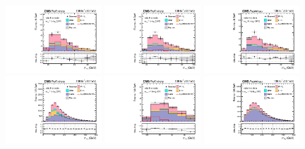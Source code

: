 \begin{figure}[ht]
    \begin{center}
        \includegraphics[width=0.32\textwidth]{figures/ch-10-results/et_all_1_post_prelim-yes.pdf}
        \includegraphics[width=0.32\textwidth]{figures/ch-10-results/et_all_2_post_prelim-yes.pdf}
        \includegraphics[width=0.32\textwidth]{figures/ch-10-results/et_all_3_post_prelim-yes.pdf}\\
        \includegraphics[width=0.32\textwidth]{figures/ch-10-results/et_all_4_post_prelim-yes.pdf}
        \includegraphics[width=0.32\textwidth]{figures/ch-10-results/et_all_5_post_prelim-yes.pdf}
        \includegraphics[width=0.32\textwidth]{figures/ch-10-results/et_all_6_post_prelim-yes.pdf}

\end{center}
\end{figure}
